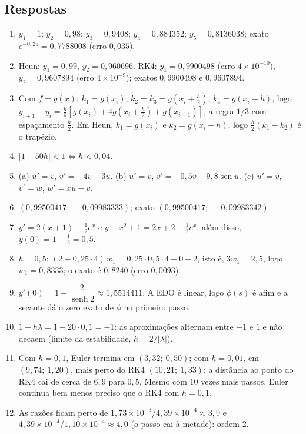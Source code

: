 \subsection*{Respostas}
\begin{enumerate}[label=\textbf{\arabic*.},leftmargin=*,nosep]
\item $y_1=1$; $y_2=0{,}98$; $y_3=0{,}9408$; $y_4=0{,}884352$; $y_5=0{,}8136038$; exato
  $e^{-0{,}25}=0{,}7788008$ (erro $0{,}035$).
\item Heun: $y_1=0{,}99$, $y_2=0{,}960696$. RK4: $y_1=0{,}9900498$ (erro $4\times10^{-10}$),
  $y_2=0{,}9607894$ (erro $4\times10^{-9}$); exatos $0{,}9900498$ e $0{,}9607894$.
\item Com $f=g(x)$: $k_1=g(x_i)$, $k_2=k_3=g(x_i+\frac h2)$, $k_4=g(x_i+h)$, logo
  $y_{i+1}-y_i=\frac h6[g(x_i)+4g(x_i+\frac h2)+g(x_{i+1})]$, a regra $1/3$ com espaçamento
  $\frac h2$. Em Heun, $k_1=g(x_i)$ e $k_2=g(x_i+h)$, logo $\frac h2(k_1+k_2)$ é o trapézio.
\item $|1-50h|<1\iff h<0{,}04$.
\item (a) $u'=v$, $v'=-4v-3u$. (b) $u'=v$, $v'=-0{,}5v-9{,}8\operatorname{sen}u$.
  (c) $u'=v$, $v'=w$, $w'=xu-v$.
\item $(0{,}99500417;\ -0{,}09983333)$; exato $(0{,}99500417;\ -0{,}09983342)$.
\item $y'=2(x+1)-\frac12e^x$ e $y-x^2+1=2x+2-\frac12e^x$; além disso, $y(0)=1-\frac12=0{,}5$.
\item $h=0{,}5$: $(2+0{,}25\cdot4)\,w_1=0{,}25\cdot0{,}5\cdot4+0+2$, isto é, $3w_1=2{,}5$, logo
  $w_1=0{,}8333$; o exato é $0{,}8240$ (erro $0{,}0093$).
\item $y'(0)=1+\dfrac{2}{\operatorname{senh}2}\approx1{,}5514411$. A EDO é linear, logo
  $\phi(s)$ é afim e a secante dá o zero exato de $\phi$ no primeiro passo.
\item $1+h\lambda=1-20\cdot0{,}1=-1$: as aproximações alternam entre $-1$ e $1$ e não decaem
  (limite da estabilidade, $h=2/|\lambda|$).
\item Com $h=0{,}1$, Euler termina em $(3{,}32;\ 0{,}50)$; com $h=0{,}01$, em $(9{,}74;\ 1{,}20)$,
  mais perto do RK4 $(10{,}21;\ 1{,}33)$: a distância ao ponto do RK4 cai de cerca de $6{,}9$
  para $0{,}5$. Mesmo com 10 vezes mais passos, Euler continua bem menos preciso que o RK4
  com $h=0{,}1$.
\item As razões ficam perto de $1{,}73\times10^{-3}/4{,}39\times10^{-4}\approx3{,}9$ e
  $4{,}39\times10^{-4}/1{,}10\times10^{-4}\approx4{,}0$ (o passo cai à metade): ordem 2.
\end{enumerate}
